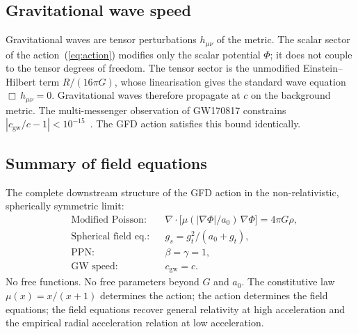 \documentclass[11pt]{article}
\begin{document}
\subsection*{Gravitational wave speed}

Gravitational waves are tensor perturbations $h_{\mu\nu}$
of the metric.  The scalar sector of the
action~(\ref{eq:action}) modifies only the scalar
potential $\Phi$; it does not couple to the tensor
degrees of freedom.  The tensor sector is the unmodified
Einstein--Hilbert term $R/(16\pi G)$, whose linearisation
gives the standard wave equation
$\Box\,h_{\mu\nu} = 0$.  Gravitational waves therefore
propagate at $c$ on the background metric.  The
multi-messenger observation of GW170817 constrains
$|c_{\text{gw}}/c - 1| < 10^{-15}$~\cite{Abbott2017}.
The GFD action satisfies this bound identically.

\subsection*{Summary of field equations}

The complete downstream structure of the GFD action in
the non-relativistic, spherically symmetric limit:
\begin{align}
  &\text{Modified Poisson:} &
    &\nabla\!\cdot\!\bigl[
      \mu(|\nabla\Phi|/a_0)\,\nabla\Phi
    \bigr] = 4\pi G\rho,
    \label{eq:summary_poisson} \\[4pt]
  &\text{Spherical field eq.:} &
    &g_s = g_t^2/(a_0 + g_t),
    \label{eq:summary_sst} \\[4pt]
  &\text{PPN:} &
    &\beta = \gamma = 1,
    \label{eq:summary_ppn} \\[4pt]
  &\text{GW speed:} &
    &c_{\text{gw}} = c.
    \label{eq:summary_gw}
\end{align}
No free functions.  No free parameters beyond $G$ and
$a_0$.  The constitutive law $\mu(x) = x/(x{+}1)$
determines the action; the action determines the field
equations; the field equations recover general relativity
at high acceleration and the empirical radial
acceleration relation at low acceleration.

\end{document}
